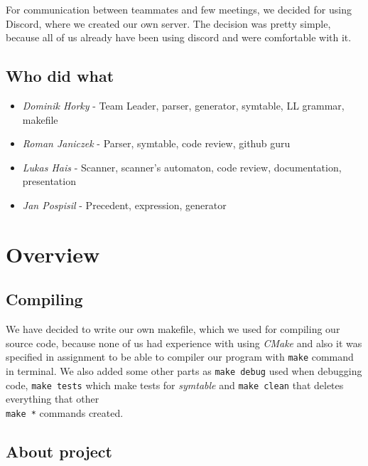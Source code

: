 \documentclass[11pt, titlepage]{article}
\begin{document}
For communication between teammates and few meetings, we decided for
using Discord, where we created our own server. The decision was pretty
simple, because all of us already have been using discord and were
comfortable with it.

\subsection{Who did what}\label{who-did-what}

\begin{itemize}[itemsep=-5pt]
\item
  \emph{Dominik Horky} - Team Leader, parser, generator, symtable, LL
  grammar, makefile
\item
  \emph{Roman Janiczek} - Parser, symtable, code review, github guru
\item
  \emph{Lukas Hais} - Scanner, scanner's automaton, code review,
  documentation, presentation
\item
  \emph{Jan Pospisil} - Precedent, expression, generator
\end{itemize}





\section{Overview}\label{overview}

\subsection{Compiling}\label{compiling}

We have decided to write our own makefile, which we used for compiling
our source code, because none of us had experience with using
\emph{CMake} and also it was specified in assignment to be able to
compiler our program with \texttt{make} command in terminal. We also
added some other parts as \texttt{make\ debug} used when debugging code,
\texttt{make\ tests} which make tests for \emph{symtable} and
\texttt{make\ clean} that deletes everything that other \\\texttt{make\ *}
commands created.

\subsection{About project}\label{about-project}
\end{document}
